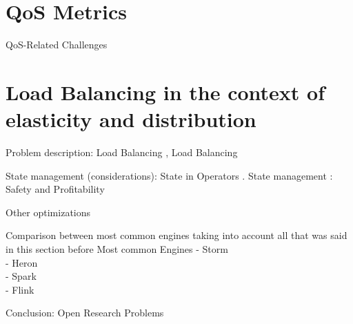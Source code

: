 
  \section{QoS Metrics}
  QoS-Related Challenges\cite{chakravarthy2009stream}
  \section{Load Balancing in the context of elasticity and distribution}

  Problem description: Load Balancing  \cite{Hirzel_2014},   Load Balancing \cite{R_ger_2019}

  State management (considerations): State in Operators \cite{R_ger_2019}. State management \cite{R_ger_2019}: Safety and Profitability \cite{Schneider_2013}\cite{R_ger_2019}

  Other optimizations

  Comparison between most common engines taking into account all that was said in this section before
  Most common Engines  \cite{kamburugamuve2013survey}
  - Storm  \cite{kamburugamuve2013survey} \cite{R_ger_2019}\\
  - Heron \cite{R_ger_2019}\\
  - Spark \cite{R_ger_2019}\\
  - Flink \cite{R_ger_2019}

  Conclusion: Open Research Problems \cite{Schneider_2013}


